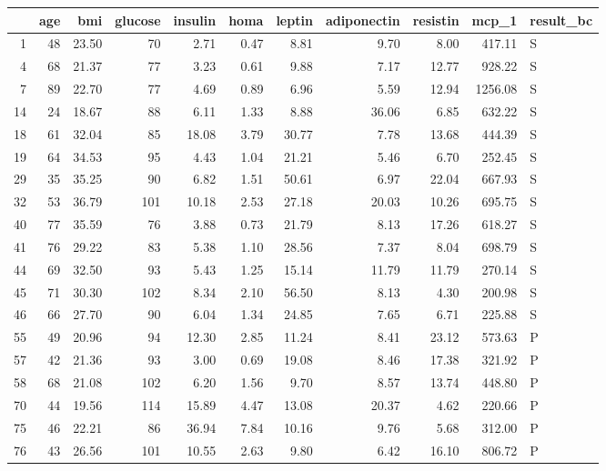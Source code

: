 \begin{table}[ht]
\centering
\begin{tabular}{rrrrrrrrrrl}
  \hline
 & age & bmi & glucose & insulin & homa & leptin & adiponectin & resistin & mcp\_1 & result\_bc \\ 
  \hline
1 &  48 & 23.50 &  70 & 2.71 & 0.47 & 8.81 & 9.70 & 8.00 & 417.11 & S \\ 
  4 &  68 & 21.37 &  77 & 3.23 & 0.61 & 9.88 & 7.17 & 12.77 & 928.22 & S \\ 
  7 &  89 & 22.70 &  77 & 4.69 & 0.89 & 6.96 & 5.59 & 12.94 & 1256.08 & S \\ 
  14 &  24 & 18.67 &  88 & 6.11 & 1.33 & 8.88 & 36.06 & 6.85 & 632.22 & S \\ 
  18 &  61 & 32.04 &  85 & 18.08 & 3.79 & 30.77 & 7.78 & 13.68 & 444.39 & S \\ 
  19 &  64 & 34.53 &  95 & 4.43 & 1.04 & 21.21 & 5.46 & 6.70 & 252.45 & S \\ 
  29 &  35 & 35.25 &  90 & 6.82 & 1.51 & 50.61 & 6.97 & 22.04 & 667.93 & S \\ 
  32 &  53 & 36.79 & 101 & 10.18 & 2.53 & 27.18 & 20.03 & 10.26 & 695.75 & S \\ 
  40 &  77 & 35.59 &  76 & 3.88 & 0.73 & 21.79 & 8.13 & 17.26 & 618.27 & S \\ 
  41 &  76 & 29.22 &  83 & 5.38 & 1.10 & 28.56 & 7.37 & 8.04 & 698.79 & S \\ 
  44 &  69 & 32.50 &  93 & 5.43 & 1.25 & 15.14 & 11.79 & 11.79 & 270.14 & S \\ 
  45 &  71 & 30.30 & 102 & 8.34 & 2.10 & 56.50 & 8.13 & 4.30 & 200.98 & S \\ 
  46 &  66 & 27.70 &  90 & 6.04 & 1.34 & 24.85 & 7.65 & 6.71 & 225.88 & S \\ 
  55 &  49 & 20.96 &  94 & 12.30 & 2.85 & 11.24 & 8.41 & 23.12 & 573.63 & P \\ 
  57 &  42 & 21.36 &  93 & 3.00 & 0.69 & 19.08 & 8.46 & 17.38 & 321.92 & P \\ 
  58 &  68 & 21.08 & 102 & 6.20 & 1.56 & 9.70 & 8.57 & 13.74 & 448.80 & P \\ 
  70 &  44 & 19.56 & 114 & 15.89 & 4.47 & 13.08 & 20.37 & 4.62 & 220.66 & P \\ 
  75 &  46 & 22.21 &  86 & 36.94 & 7.84 & 10.16 & 9.76 & 5.68 & 312.00 & P \\ 
  76 &  43 & 26.56 & 101 & 10.55 & 2.63 & 9.80 & 6.42 & 16.10 & 806.72 & P \\ 

\end{tabular}
\end{table}

